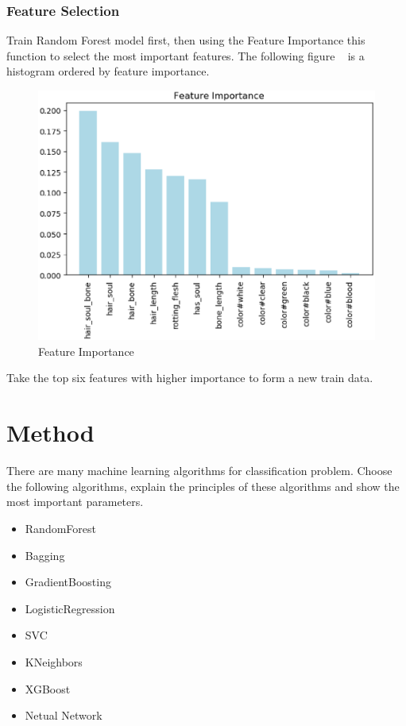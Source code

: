 \subsubsection{Feature Selection}


Train Random Forest model first, 
then using the Feature Importance this function 
to select the most important features. 
The following figure ~
is a histogram ordered by feature importance. 


\begin{figure}[htbp]
	\centering
	\includegraphics[scale=0.3]{figures/FEATURE.eps}
	\caption{Feature Importance}\label{fig:feature_importance}
\end{figure}

Take the top six features 
with higher importance 
to form a new train data.


\section{Method}

There are many machine learning algorithms 
for classification problem. 
Choose the following algorithms, 
explain the principles of
these algorithms and 
show the most important parameters.

\begin{itemize}
	\item RandomForest 
	\item Bagging
	\item GradientBoosting
	\item LogisticRegression
	\item SVC
	\item KNeighbors 
	\item XGBoost
	\item Netual Network
\end{itemize}

